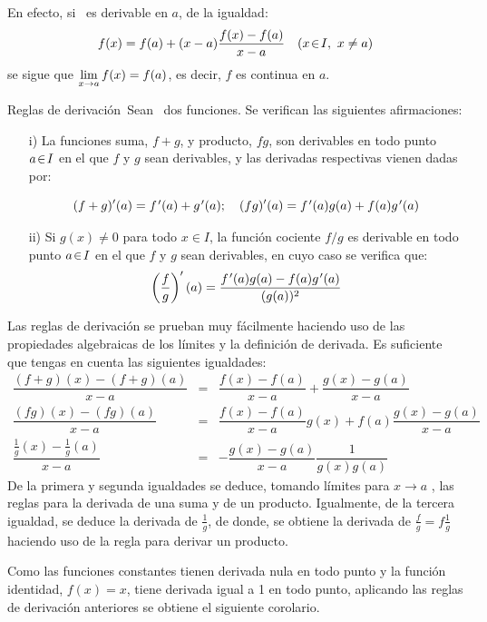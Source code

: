 \begin{prueba} En efecto, si \ es derivable en $a$,
de la igualdad: 
\[
f(x)=f(a)+(x-a)\frac{f(x)-f(a)}{x-a}\quad(x\!\in\! I,\ x\neq a)
\]
se sigue que $\displaystyle\lim_{x\to a}f(x)=f(a)$, es decir, $f$ es continua
en $a$.\end{prueba}

\begin{teo}{Reglas de derivación}{}\ Sean \ dos
funciones. Se verifican las siguientes afirmaciones: 
\begin{itemize}
\item[i)] La funciones suma, $f+g$, y producto, $fg$, son derivables en todo
punto $a\!\in\! I$ en el que $f$ y $g$ sean derivables, y las derivadas
respectivas vienen dadas por:

\[
(f+g)^{\prime}(a)=f\mbox{$^{\mspace{2mu}\prime}$}(a)+g\mbox{$^{\mspace{2mu}\prime}$}(a);\quad(fg)^{\prime}(a)=f\mbox{$^{\mspace{2mu}\prime}$}(a)g(a)+f(a)g\mbox{$^{\mspace{2mu}\prime}$}(a)
\]

\item[ii)] Si $g(x)\neq0$ para todo $x\in I$, la función cociente $f/g$ es
derivable en todo punto $a\!\in\! I$ en el que $f$ y $g$ sean derivables,
en cuyo caso se verifica que: 
\[
\left(\frac{f}{g}\right)^{\prime}(a)=\frac{f\mbox{$^{\mspace{2mu}\prime}$}(a)g(a)-f(a)g\mbox{$^{\mspace{2mu}\prime}$}(a)}{(g(a))^{2}}
\]
\end{itemize}
\end{teo} 

\begin{prueba} Las reglas de derivación se prueban muy fácilmente
haciendo uso de las propiedades algebraicas de los límites y la definición
de derivada. Es suficiente que tengas en cuenta las siguientes igualdades:
\begin{eqnarray*}
\dfrac{(f+g)(x)-(f+g)(a)}{x-a} & = & \dfrac{f(x)-f(a)}{x-a}+\dfrac{g(x)-g(a)}{x-a}\\
\dfrac{(fg)(x)-(fg)(a)}{x-a} & = & \dfrac{f(x)-f(a)}{x-a}g(x)+f(a)\dfrac{g(x)-g(a)}{x-a}\\
\dfrac{\frac{1}{g}(x)-\frac{1}{g}(a)}{x-a} & = & -\dfrac{g(x)-g(a)}{x-a}\dfrac{1}{g(x)g(a)}
\end{eqnarray*}
De la primera y segunda igualdades se deduce, tomando límites para
$x\to a$ , las reglas para la derivada de una suma y de un producto.
Igualmente, de la tercera igualdad, se deduce la derivada de $\frac{1}{g}$,
de donde, se obtiene la derivada de $\frac{f}{g}=f\frac{1}{g}$ haciendo
uso de la regla para derivar un producto.\end{prueba}

Como las funciones constantes tienen derivada nula en todo punto y
la función identidad, $f(x)=x$, tiene derivada igual a 1 en todo
punto, aplicando las reglas de derivación anteriores se obtiene el
siguiente corolario.

